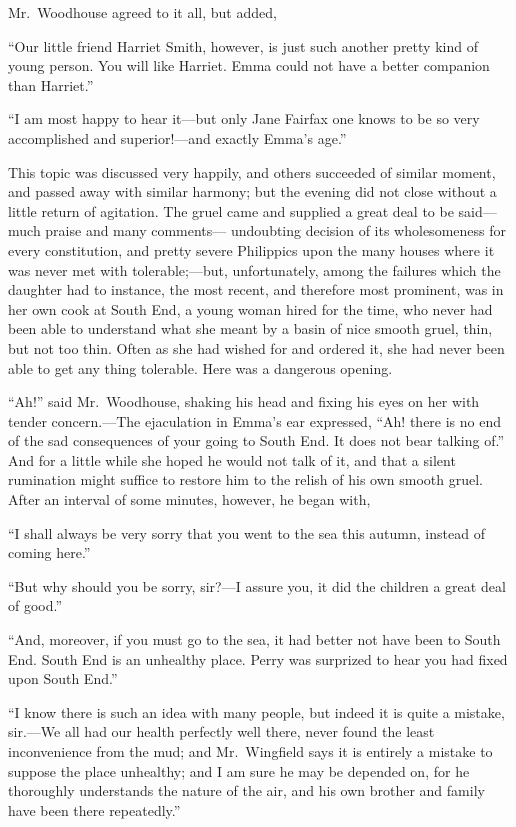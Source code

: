Mr.\ Woodhouse agreed to it all, but added,

``Our little friend Harriet Smith, however, is just such another
pretty kind of young person.  You will like Harriet.  Emma could
not have a better companion than Harriet.''

``I am most happy to hear it---but only Jane Fairfax one knows to be
so very accomplished and superior!---and exactly Emma's age.''

This topic was discussed very happily, and others succeeded of
similar moment, and passed away with similar harmony; but the evening
did not close without a little return of agitation.  The gruel came
and supplied a great deal to be said---much praise and many comments---%
undoubting decision of its wholesomeness for every constitution,
and pretty severe Philippics upon the many houses where it was
never met with tolerable;---but, unfortunately, among the failures
which the daughter had to instance, the most recent, and therefore
most prominent, was in her own cook at South End, a young woman
hired for the time, who never had been able to understand what she
meant by a basin of nice smooth gruel, thin, but not too thin.
Often as she had wished for and ordered it, she had never been able
to get any thing tolerable.  Here was a dangerous opening.

``Ah!'' said Mr.\ Woodhouse, shaking his head and fixing his eyes on
her with tender concern.---The ejaculation in Emma's ear expressed,
``Ah! there is no end of the sad consequences of your going to
South End.  It does not bear talking of.''  And for a little while
she hoped he would not talk of it, and that a silent rumination
might suffice to restore him to the relish of his own smooth gruel.
After an interval of some minutes, however, he began with,

``I shall always be very sorry that you went to the sea this autumn,
instead of coming here.''

``But why should you be sorry, sir?---I assure you, it did the children
a great deal of good.''

``And, moreover, if you must go to the sea, it had better not
have been to South End.  South End is an unhealthy place.
Perry was surprized to hear you had fixed upon South End.''

``I know there is such an idea with many people, but indeed it is
quite a mistake, sir.---We all had our health perfectly well there,
never found the least inconvenience from the mud; and Mr.\ Wingfield
says it is entirely a mistake to suppose the place unhealthy;
and I am sure he may be depended on, for he thoroughly understands
the nature of the air, and his own brother and family have been
there repeatedly.''

